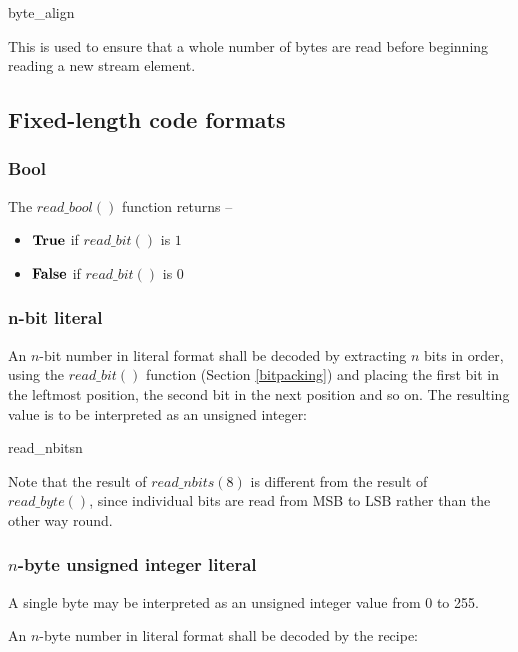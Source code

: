 \begin{pseudo}{byte\_align}{}
\end{pseudo}

This is used to ensure that a whole number of bytes are read before
beginning reading a new stream element.

\subsection{Fixed-length code formats}
\subsubsection{Bool}

The $read\_bool()$ function returns --
\begin{itemize}
\item $\text{\bf{True}}$ if $read\_bit()$ is $1$
\item $\text{\bf{False}}$ if $read\_bit()$ is $0$
\end{itemize}

\subsubsection{n-bit literal}
An $n$-bit number in literal format shall be decoded by extracting $n$ bits
in order, using the $read\_bit()$ function (Section \ref{bitpacking})
 and placing the first bit in the leftmost position, the second
bit in the next position and so on. The resulting value is to be
interpreted as an unsigned integer:

\begin{pseudo}{read\_nbits}{n}
\bsEND
{}
\end{pseudo}

\begin{informative}
Note that the result of $read\_nbits(8)$ is different from the result of $read\_byte()$,
since individual bits are read from MSB to LSB rather than the other way round.
\end{informative}

\subsubsection{$n$-byte unsigned integer literal}
A single byte may be interpreted as an unsigned integer value from 0 to 255.

An $n$-byte number in literal format shall be decoded by the recipe:

